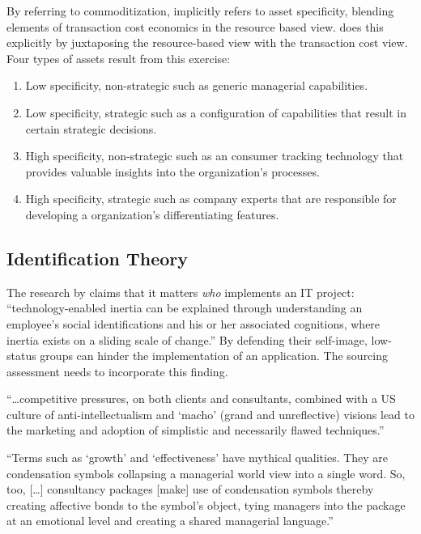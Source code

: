 \documentclass[12pt]{article}
\providecommand{\tightlist}{%
  \setlength{\itemsep}{0pt}\setlength{\parskip}{0pt}}
\begin{document}
By referring to commoditization, \citet{willcocks2003} implicitly refers
to asset specificity, blending elements of transaction cost economics in
the resource based view. \citet{watjatrakul2005} does this explicitly by
juxtaposing the resource-based view with the transaction cost view. Four
types of assets result from this exercise:

\begin{enumerate}
\def\labelenumi{\arabic{enumi}.}
\tightlist
\item
  Low specificity, non-strategic such as generic managerial
  capabilities.
\item
  Low specificity, strategic such as a configuration of capabilities
  that result in certain strategic decisions.
\item
  High specificity, non-strategic such as an consumer tracking
  technology that provides valuable insights into the organization's
  processes.
\item
  High specificity, strategic such as company experts that are
  responsible for developing a organization's differentiating features.
\end{enumerate}

\hypertarget{identification-theory}{%
\subsection{Identification Theory}\label{identification-theory}}

The research by \citet[311-313]{schwarz2005} claims that it matters
\emph{who} implements an IT project: ``technology-enabled inertia can be
explained through understanding an employee's social identifications and
his or her associated cognitions, where inertia exists on a sliding
scale of change.'' By defending their self-image, low-status groups can
hinder the implementation of an application. The sourcing assessment
needs to incorporate this finding.

``\ldots competitive pressures, on both clients and consultants,
combined with a US culture of anti-intellectualism and `macho' (grand
and unreflective) visions lead to the marketing and adoption of
simplistic and necessarily flawed techniques.'' \citep[ 34]{sturdy1998}

``Terms such as `growth' and `effectiveness' have mythical qualities.
They are condensation symbols collapsing a managerial world view into a
single word. So, too, {[}\ldots{]} consultancy packages {[}make{]} use
of condensation symbols thereby creating affective bonds to the symbol's
object, tying managers into the package at an emotional level and
creating a shared managerial language.'' \citep[ 290]{gill1993}
\end{document}
